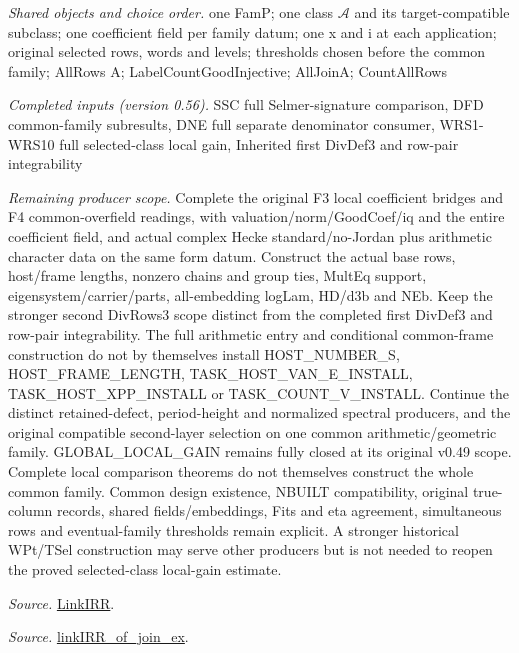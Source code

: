 \emph{Shared objects and choice order.} one FamP; one class $\mathcal A$ and its target-compatible subclass; one coefficient field per family datum; one x and i at each application; original selected rows, words and levels; thresholds chosen before the common family; AllRows A; LabelCountGoodInjective; AllJoinA; CountAllRows

\emph{Completed inputs (version 0.56).} SSC full Selmer-signature comparison, DFD common-family subresults, DNE full separate denominator consumer, WRS1-WRS10 full selected-class local gain, Inherited first DivDef3 and row-pair integrability

\emph{Remaining producer scope.} Complete the original F3 local coefficient bridges and F4 common-overfield readings, with valuation/norm/GoodCoef/iq and the entire coefficient field, and actual complex Hecke standard/no-Jordan plus arithmetic character data on the same form datum. Construct the actual base rows, host/frame lengths, nonzero chains and group ties, MultEq support, eigensystem/carrier/parts, all-embedding logLam, HD/d3b and NEb. Keep the stronger second DivRows3 scope distinct from the completed first DivDef3 and row-pair integrability. The full arithmetic entry and conditional common-frame construction do not by themselves install HOST\_\allowbreak NUMBER\_\allowbreak S, HOST\_\allowbreak FRAME\_\allowbreak LENGTH, TASK\_\allowbreak HOST\_\allowbreak VAN\_\allowbreak E\_\allowbreak INSTALL, TASK\_\allowbreak HOST\_\allowbreak XPP\_\allowbreak INSTALL or TASK\_\allowbreak COUNT\_\allowbreak V\_\allowbreak INSTALL. Continue the distinct retained-defect, period-height and normalized spectral producers, and the original compatible second-layer selection on one common arithmetic/geometric family. GLOBAL\_\allowbreak LOCAL\_\allowbreak GAIN remains fully closed at its original v0.49 scope. Complete local comparison theorems do not themselves construct the whole common family. Common design existence, NBUILT compatibility, original true-column records, shared fields/embeddings, Fits and eta agreement, simultaneous rows and eventual-family thresholds remain explicit. A stronger historical WPt/TSel construction may serve other producers but is not needed to reopen the proved selected-class local-gain estimate.

\emph{Source.} \href{https://github.com/CocoSgt/riemann-hypothesis-lean/blob/7cbf7a0c32fca1badf05931879a37c3f8a2b03b4/src/Formalism/SharpRestriction/GlobalTheoremInputs.lean#L55-L58}{LinkIRR}.

\emph{Source.} \href{https://github.com/CocoSgt/riemann-hypothesis-lean/blob/7cbf7a0c32fca1badf05931879a37c3f8a2b03b4/src/Development/AbelianVarietyTheory/Proofs/GlobalInterpolation/LinkIRROfJoinEx.lean#L17-L38}{linkIRR\_\allowbreak of\_\allowbreak join\_\allowbreak ex}.

